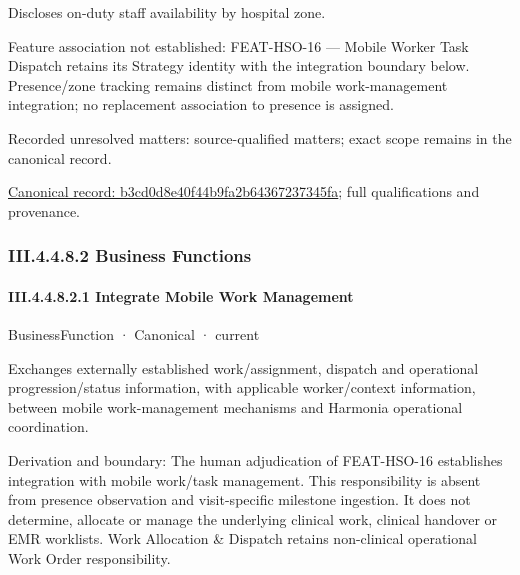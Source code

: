 Discloses on-duty staff availability by hospital zone.



Feature association not established: FEAT-HSO-16 — Mobile Worker Task Dispatch retains its Strategy identity with the integration boundary below. Presence/zone tracking remains distinct from mobile work-management integration; no replacement association to presence is assigned.


{\small Recorded unresolved matters: source-qualified matters; exact scope remains in the canonical record.}\par
{\footnotesize \href{../../../../../../../continuum/business/business-service/b3cd0d8e40f44b9fa2b64367237345fa.md}{Canonical record: b3cd0d8e40f44b9fa2b64367237345fa}; full qualifications and provenance.}\par
\subsubsection*{III.4.4.8.2 Business Functions}
\label{navigation:III.4.4.8.2}

\paragraph*{III.4.4.8.2.1 Integrate Mobile Work Management}
\label{navigation:III.4.4.8.2.1}

\label{element:81f97ad819da48f09f26029066550e08}
{\small BusinessFunction · Canonical · current}\par

Exchanges externally established work/assignment, dispatch and operational progression/status information, with applicable worker/context information, between mobile work-management mechanisms and Harmonia operational coordination.



Derivation and boundary: The human adjudication of FEAT-HSO-16 establishes integration with mobile work/task management. This responsibility is absent from presence observation and visit-specific milestone ingestion. It does not determine, allocate or manage the underlying clinical work, clinical handover or EMR worklists. Work Allocation \& Dispatch retains non-clinical operational Work Order responsibility.


